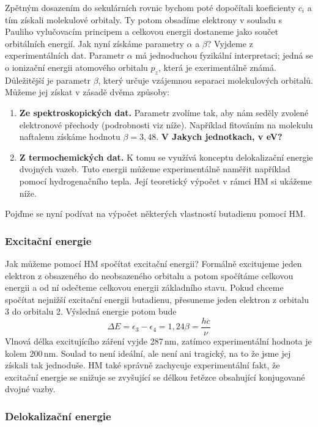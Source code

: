 Zpětným dosazením do sekulárních rovnic bychom poté dopočítali koeficienty $c_i$ a tím získali molekulové orbitaly. Ty potom obsadíme elektrony v souladu s Pauliho vylučovacím principem a celkovou energii dostaneme jako součet orbitálních energií. 
Jak nyní získáme parametry $\alpha$ a $\beta$? Vyjdeme z experimentálních dat. Parametr $\alpha$ má jednoduchou fyzikální interpretaci; jedná se o ionizační energii atomového orbitalu $p_z$, která je exerimentálně známá. Důležitější je parametr $\beta$, který určuje vzájemnou separaci molekulových orbitalů. Můžeme jej získat v zásadě dvěma způsoby:
\begin{enumerate}
\item \textbf{Ze spektroskopických dat.} Parametr zvolíme tak, aby nám seděly zvolené elektronové přechody (podrobnosti viz níže). Například fitováním na molekulu naftalenu získáme hodnotu $\beta=3,48$. \textbf{V Jakych jednotkach, v eV?}
\item \textbf{Z termochemických dat.} K tomu se využívá konceptu delokalizační energie dvojných vazeb. Tuto energii můžeme experimentálně naměřit například pomocí hydrogenačního tepla. Její teoretický výpočet v rámci HM si ukážeme níže. 
\end{enumerate}

Pojďme se nyní podívat na výpočet některých vlastností butadienu pomocí HM. 


\subsubsection{Excitační energie}

Jak můžeme pomocí HM spočítat excitační energii? Formálně excitujeme jeden elektron z obsazeného do neobsazeného orbitalu a potom spočítáme celkovou energii a od ní odečteme celkovou energii základního stavu. Pokud chceme spočítat nejnižší excitační energii butadienu, přesuneme jeden elektron z orbitalu 3 do orbitalu 2. Výsledná energie potom bude
$$
\Delta E = \epsilon_3-\epsilon_4 = 1,24 \beta = \frac{hc}{\nu} 
$$
Vlnová délka excitujícího záření vyjde 287\,nm, zatímco experimentální hodnota je kolem 200\,nm.
Soulad to není ideální, ale není ani tragický, na to že jsme jej získali tak jednoduše. HM také správně zachycuje experimentální fakt, že excitační energie se snižuje se zvyšující se délkou řetězce obsahující konjugované dvojné vazby.

\subsubsection{Delokalizační energie}

